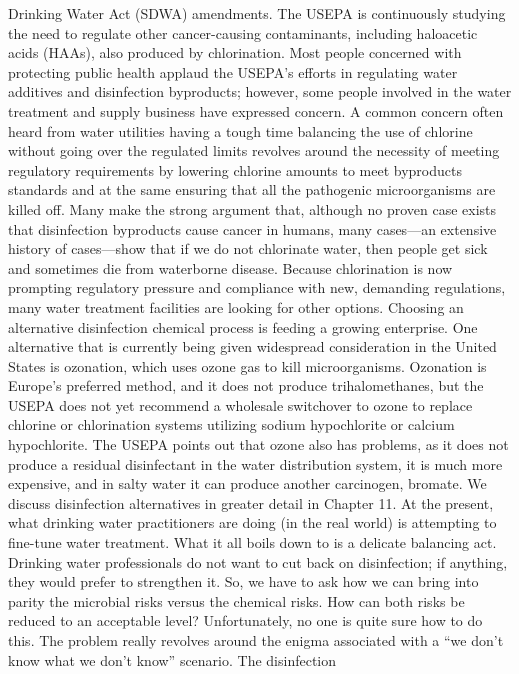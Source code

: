 \documentclass{article}
\begin{document}
Drinking Water Act (SDWA) amendments. The USEPA is continuously studying
the need to regulate other cancer-causing contaminants, including
haloacetic acids (HAAs), also produced by chlorination. Most people
concerned with protecting public health applaud the USEPA's efforts in
regulating water additives and disinfection byproducts; however, some
people involved in the water treatment and supply business have
expressed concern. A common concern often heard from water utilities
having a tough time balancing the use of chlorine without going over the
regulated limits revolves around the necessity of meeting regulatory
requirements by lowering chlorine amounts to meet byproducts standards
and at the same ensuring that all the pathogenic microorganisms are
killed off. Many make the strong argument that, although no proven case
exists that disinfection byproducts cause cancer in humans, many
cases---an extensive history of cases---show that if we do not
chlorinate water, then people get sick and sometimes die from waterborne
disease. Because chlorination is now prompting regulatory pressure and
compliance with new, demanding regulations, many water treatment
facilities are looking for other options. Choosing an alternative
disinfection chemical process is feeding a growing enterprise. One
alternative that is currently being given widespread consideration in
the United States is ozonation, which uses ozone gas to kill
microorganisms. Ozonation is Europe's preferred method, and it does not
produce trihalomethanes, but the USEPA does not yet recommend a
wholesale switchover to ozone to replace chlorine or chlorination
systems utilizing sodium hypochlorite or calcium hypochlorite. The USEPA
points out that ozone also has problems, as it does not produce a
residual disinfectant in the water distribution system, it is much more
expensive, and in salty water it can produce another carcinogen,
bromate. We discuss disinfection alternatives in greater detail in
Chapter 11. At the present, what drinking water practitioners are doing
(in the real world) is attempting to fine-tune water treatment. What it
all boils down to is a delicate balancing act. Drinking water
professionals do not want to cut back on disinfection; if anything, they
would prefer to strengthen it. So, we have to ask how we can bring into
parity the microbial risks versus the chemical risks. How can both risks
be reduced to an acceptable level? Unfortunately, no one is quite sure
how to do this. The problem really revolves around the enigma associated
with a ``we don't know what we don't know'' scenario. The disinfection
\end{document}
